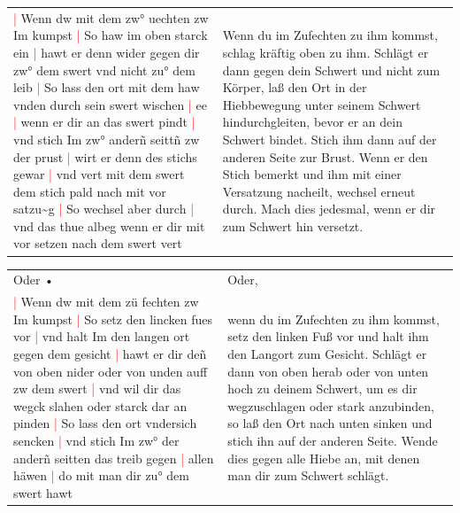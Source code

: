 \begin{longtable}{p{6.25cm}p{6.25cm}}
    \textcolor{red}{|} Wenn dw mit dem zw° uechten zw Im kumpst
    \textcolor{red}{|} So haw im oben starck ein
    \textcolor{red}{|} hawt er denn wider gegen dir zw° dem swert vnd nicht zu° dem leib
    \textcolor{red}{|} So lass den ort mit dem haw vnden durch sein swert wischen
    \textcolor{red}{|} ee
    \textcolor{red}{|} wenn er dir an das swert pindt
    \textcolor{red}{|} vnd stich Im zw° anderñ seittñ zw der prust
    \textcolor{red}{|} wirt er denn des stichs gewar
    \textcolor{red}{|} vnd vert mit dem swert dem stich pald nach mit vor satzu\textasciitilde{}g
    \textcolor{red}{|} So wechsel aber durch
    \textcolor{red}{|} vnd das thue albeg wenn er dir mit vor setzen nach dem swert vert
    &
    Wenn du im Zufechten zu ihm kommst, schlag kräftig oben zu ihm.
    Schlägt er dann gegen dein Schwert und nicht zum Körper, laß den Ort in der Hiebbewegung unter seinem Schwert hindurchgleiten, bevor er an dein Schwert bindet. Stich ihm dann auf der anderen Seite zur Brust.
    Wenn er den Stich bemerkt und ihm mit einer Versatzung nacheilt, wechsel erneut durch. Mach dies jedesmal, wenn er dir zum Schwert hin versetzt.
\end{longtable}

\newpage

\begin{center}
\end{center}

\newpage

\begin{longtable}{p{6.25cm}p{6.25cm}}
    Oder •
    &
    Oder,
    \\
    \textcolor{red}{|} Wenn dw mit dem zü fechten zw Im kumpst
    \textcolor{red}{|} So setz den lincken fues vor
    \textcolor{red}{|} vnd halt Im den langen ort gegen dem gesicht
    \textcolor{red}{|} hawt er dir deñ von oben nider oder von unden auff zw dem swert
    \textcolor{red}{|} vnd wil dir das wegck slahen oder starck dar an pinden
    \textcolor{red}{|} So lass den ort vndersich sencken
    \textcolor{red}{|} vnd stich Im zw° der anderñ seitten das treib gegen
    \textcolor{red}{|} allen häwen
    \textcolor{red}{|} do mit man dir zu° dem swert hawt
    &
    wenn du im Zufechten zu ihm kommst, setz den linken Fuß vor und halt ihm den Langort zum Gesicht.
    Schlägt er dann von oben herab oder von unten hoch zu deinem Schwert, um es dir wegzuschlagen oder stark anzubinden, so laß den Ort nach unten sinken und stich ihn auf der anderen Seite.
    Wende dies gegen alle Hiebe an, mit denen man dir zum Schwert schlägt.
\end{longtable}


